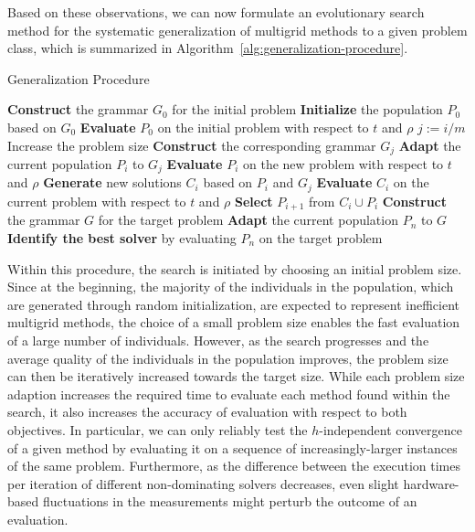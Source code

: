 Based on these observations, we can now formulate an evolutionary search method for the systematic generalization of multigrid methods to a given problem class, which is summarized in Algorithm~\ref{alg:generalization-procedure}.
\begin{algorithm}
	\caption{Generalization Procedure}
	\label{alg:generalization-procedure}
	\begin{algorithmic}[1] %
		\State \textbf{Construct} the grammar $G_0$ for the initial problem
		\State \textbf{Initialize} the population $P_0$ based on $G_0$
		\State \textbf{Evaluate} $P_0$ on the initial problem with respect to $t$ and $\rho$
		\State $j := i / m$ 
		\State Increase the problem size
		\State \textbf{Construct} the corresponding grammar $G_j$
		\State  \textbf{Adapt} the current population $P_i$ to $G_j$
		\State \textbf{Evaluate} $P_i$ on the new problem with respect to $t$ and $\rho$
		\EndIf
		\State \textbf{Generate} new solutions $C_i$ based on $P_i$ and $G_j$
		\State \textbf{Evaluate} $C_i$ on the current problem with respect to $t$ and $\rho$
		\State \textbf{Select} $P_{i+1}$ from $C_i \cup P_i$
		\EndFor
		\State \textbf{Construct} the grammar $G$ for the target problem
		\State  \textbf{Adapt} the current population $P_n$ to $G$
		\State \textbf{Identify the best solver} by evaluating $P_{n}$ on the target problem
	\end{algorithmic}
\end{algorithm}
Within this procedure, the search is initiated by choosing an initial problem size.
Since at the beginning, the majority of the individuals in the population, which are generated through random initialization, are expected to represent inefficient multigrid methods, the choice of a small problem size enables the fast evaluation of a large number of individuals.
However, as the search progresses and the average quality of the individuals in the population improves, the problem size can then be iteratively increased towards the target size.
While each problem size adaption increases the required time to evaluate each method found within the search, it also increases the accuracy of evaluation with respect to both objectives.
In particular, we can only reliably test the $h$-independent convergence of a given method by evaluating it on a sequence of increasingly-larger instances of the same problem.
Furthermore, as the difference between the execution times per iteration of different non-dominating solvers decreases, even slight hardware-based fluctuations in the measurements might perturb the outcome of an evaluation.
